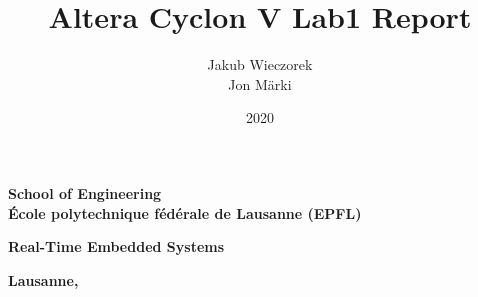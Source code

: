 \documentclass[a4paper,titlepage,11pt,twosides,floatssmall]{mwrep}
\begin{document}
	
	\frenchspacing
	\makeatletter
	\def\ps@uheadings{%
		\let\@mkboth\markboth
		\let\ps@normal\hf@uheadings
		\let\ps@opening\hf@plain
		\let\ps@closing\hf@uheadings
		\let\ps@blank\hf@empty
		\ps@normal
		\def\chaptermark##1{%
			\markright{%
				\ifHeadingNumbered
				\thechapter.\enspace
				\fi
				##1}}}
	
	\pagestyle{uheadings}
	
	\title{\bf Altera Cyclon V Lab1 Report\vskip 0.1cm}
	\author{Jakub Wieczorek \\ Jon Märki}

	\date{2020}
	
	\makeatletter
	\renewcommand{\maketitle}{\begin{titlepage}
			\begin{center}{\LARGE {\bf
						School of Engineering}}\\
				\vspace{0.4cm}
				{\LARGE {\bf École polytechnique fédérale de Lausanne (EPFL)}}\\
				\vspace{0.3cm}
			\end{center}
			\vspace{5cm}
			\begin{center}
				{\bf \LARGE Real-Time Embedded Systems\vskip 0.1cm}
			\end{center}
			\vspace{1cm}
			\begin{center}
				{\bf \LARGE \@title}
			\end{center}
			\vspace{2cm}
			\begin{center}
				{\bf \Large \@author \par}
			\end{center}
			\vspace*{\stretch{6}}
			\begin{center}
				\bf{\large{Lausanne, \@date\vskip 0.1cm}}
			\end{center}
		\end{titlepage}
	}

	\makeatother
	
	\newcommand{\at}[2][]{#1|_{#2}}
	
	\maketitle
	
	\tableofcontents
	\setcounter{page}{2}
	

	
	\listoffigures
	\listoftables
\end{document}
